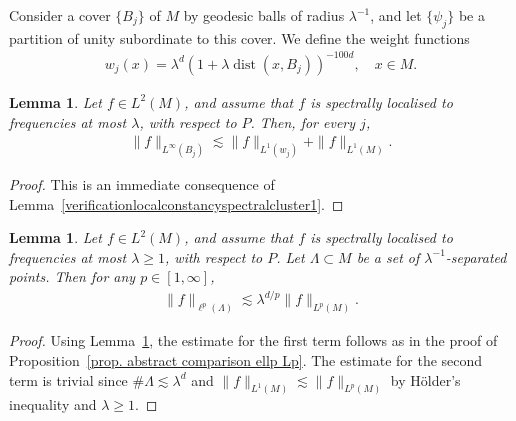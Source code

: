 \documentclass[12pt,reqno]{amsart}
\newtheorem{lemma}[theorem]{Lemma}
\theoremstyle{definition}
\theoremstyle{remark}
\numberwithin{equation}{section}
\newcommand{\1}{\mathbbm{1}}
\DeclareMathOperator{\dist}{dist}
\begin{document}
Consider a cover $\{B_j\}$ of $M$ by geodesic balls of radius $\lambda^{-1}$, and let $\{\psi_j\}$ be a partition of unity subordinate to this cover. 
We define the weight functions
\begin{align}\label{def. w_j}
  w_{j}(x)=\lambda^d(1+\lambda\dist(x,B_j))^{-100d},\quad x\in M.
\end{align}



\begin{lemma}\label{lemma locally constant}
  Let $f\in L^2(M)$, and assume that $f$ is spectrally localised to frequencies at most $\lambda$, with respect to $P$. Then, for every $j$,
  \begin{align*}
    \|f\|_{L^{\infty}(B_j)}\lesssim \|f\|_{L^1(w_j)}+\|f\|_{L^1(M)}.
  \end{align*}
\end{lemma} 

\begin{proof}
This is an immediate consequence of Lemma~\ref{verificationlocalconstancyspectralcluster1}.
\end{proof}

\begin{lemma}\label{verificationlocalconstancyspectralcluster2}
  Let $f\in L^2(M)$, and assume that $f$ is spectrally localised to frequencies at most $\lambda\geq1$, with respect to $P$. Let $\Lambda\subset M$ be a set of $\lambda^{-1}$-separated points. Then for any $p\in [1,\infty]$,
  \begin{align*}
    \|f\|_{\ell^p(\Lambda)}\lesssim \lambda^{d/p}\|f\|_{L^p(M)}.
  \end{align*}
\end{lemma}

\begin{proof}
  Using Lemma~\ref{lemma locally constant}, the estimate for the first term follows as in the proof of Proposition~\ref{prop. abstract comparison ellp Lp}. The estimate for the second term is trivial since $\#\Lambda\lesssim\lambda^d$ and $\|f\|_{L^1(M)}\lesssim \|f\|_{L^p(M)}$ by H\"older's inequality and $\lambda\geq1$.
\end{proof}


% 
% 
\end{document}
